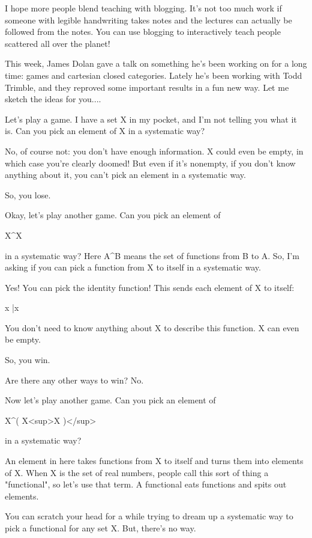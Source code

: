 I hope more people blend teaching with blogging.  It's not too much work 
if someone with legible handwriting takes notes and the lectures can 
actually be followed from the notes.  You can use blogging to 
interactively teach people scattered all over the planet!

This week, James Dolan gave a talk on something he's been working on for 
a long time: games and cartesian closed categories.  Lately he's been 
working with Todd Trimble, and they reproved some important results in
a fun new way.  Let me sketch the ideas for you....

Let's play a game.  I have a set X in my pocket, and I'm not telling 
you what it is.  Can you pick an element of X in a systematic way?  

No, of course not: you don't have enough information.  X could even 
be empty, in which case you're clearly doomed!  But even if it's nonempty, 
if you don't know anything about it, you can't pick an element in a 
systematic way.  

So, you lose.

Okay, let's play another game.  Can you pick an element of 

X^{X} 

in a systematic way?  Here A^{B} means the set of functions
from B to A.  So, I'm asking if you can pick a function from X to
itself in a systematic way.

Yes!  You can pick the identity function!  This sends each element
of X to itself:

x |\to  x

You don't need to know anything about X to describe this function. 
X can even be empty.  

So, you win.  

Are there any other ways to win?  No.  

Now let's play another game.  Can you pick an element of 

X^{( X<sup>X} )</sup>

in a systematic way?  

An element in here takes functions from X to itself and turns them into 
elements of X.  When X is the set of real numbers, people call this sort 
of thing a "functional", so let's use that term.  A functional eats 
functions and spits out elements.

You can scratch your head for a while trying to dream up a systematic
way to pick a functional for any set X.  But, there's no way. 

